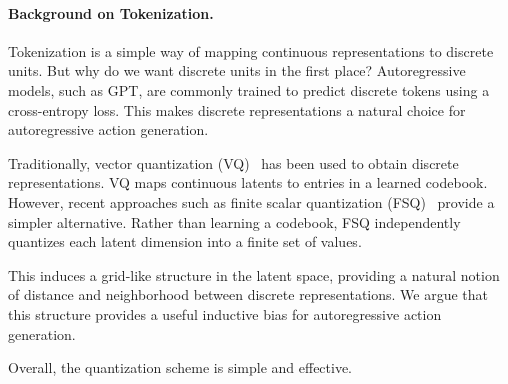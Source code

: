 \paragraph{Background on Tokenization.}
Tokenization is a simple way of mapping continuous representations
to discrete units. But why do we want discrete units in the first
place? Autoregressive models, such as GPT, are commonly trained
to predict discrete tokens using a cross-entropy loss. This makes
discrete representations a natural choice for autoregressive
action generation.

Traditionally, vector quantization (VQ)~\cite{vq} has been used
to obtain discrete representations. VQ maps continuous latents
to entries in a learned codebook. However, recent approaches
such as finite scalar quantization (FSQ)~\cite{fsq} provide
a simpler alternative. Rather than learning a codebook,
FSQ independently quantizes each latent dimension into a
finite set of values.

This induces a grid-like structure in the latent space,
providing a natural notion of distance and neighborhood
between discrete representations. We argue that this
structure provides a useful inductive bias for
autoregressive action generation.

Overall, the quantization scheme is simple and effective.